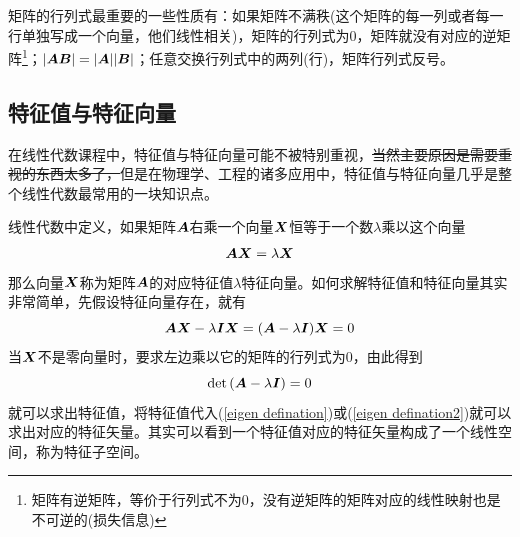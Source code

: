 \documentclass[12pt,a4paper,openany,twoside]{book}
\numberwithin{equation}{section}
\begin{document}
          矩阵的行列式最重要的一些性质有：如果矩阵不满秩(这个矩阵的每一列或者每一行单独写成一个向量，他们线性相关)，矩阵的行列式为0，矩阵就没有对应的逆矩阵\footnote{矩阵有逆矩阵，等价于行列式不为0，没有逆矩阵的矩阵对应的线性映射也是不可逆的(损失信息)}；$\abs{\vb*{A B}}=\abs{\vb*{A}}\abs{\vb*{B}}$；任意交换行列式中的两列(行)，矩阵行列式反号。

        \subsection{特征值与特征向量}
          在线性代数课程中，特征值与特征向量可能不被特别重视，\sout{当然主要原因是需要重视的东西太多了，}但是在物理学、工程的诸多应用中，特征值与特征向量几乎是整个线性代数最常用的一块知识点。

          线性代数中定义，如果矩阵$\vb*{A}$右乘一个向量$\vb*{X}$恒等于一个数$\lambda$乘以这个向量
          \begin{equation}
            \vb*{AX}=\lambda\vb*{X}
            \label{eigen defination}
          \end{equation}
          那么向量$\vb*{X}$称为矩阵$\vb*{A}$的对应特征值$\lambda$特征向量。如何求解特征值和特征向量其实非常简单，先假设特征向量存在，就有
          \begin{equation}
            \vb*{AX}-\lambda\vb*{I}\vb*{X}=\qty(\vb*{A}-\lambda\vb*{I})\vb*{X}=0
            \label{eigen defination2}
          \end{equation}
          当$\vb*{X}$不是零向量时，要求左边乘以它的矩阵的行列式为0，由此得到
          \begin{equation}
            \det\qty(\vb*{A}-\lambda\vb*{I})=0
            \label{eigen equ}
          \end{equation}
          就可以求出特征值，将特征值代入(\ref{eigen defination})或(\ref{eigen defination2})就可以求出对应的特征矢量。其实可以看到一个特征值对应的特征矢量构成了一个线性空间，称为特征子空间。
\end{document}

